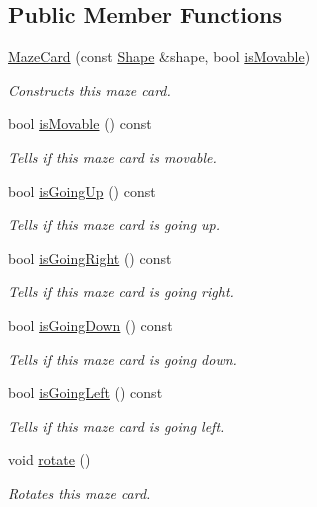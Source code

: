 \subsection*{Public Member Functions}
\begin{DoxyCompactItemize}
\item 
\mbox{\hyperlink{structlabyrinth_1_1_maze_card_aeecd62a0f2f0336fb36cb44e479f4ce2}{Maze\+Card}} (const \mbox{\hyperlink{structlabyrinth_1_1_maze_card_1_1_shape}{Shape}} \&shape, bool \mbox{\hyperlink{structlabyrinth_1_1_maze_card_ae4c534a31b1ac1616d7116d9eb1a39fd}{is\+Movable}})
\begin{DoxyCompactList}\small\item\em Constructs this maze card. \end{DoxyCompactList}\item 
bool \mbox{\hyperlink{structlabyrinth_1_1_maze_card_ae4c534a31b1ac1616d7116d9eb1a39fd}{is\+Movable}} () const
\begin{DoxyCompactList}\small\item\em Tells if this maze card is movable. \end{DoxyCompactList}\item 
bool \mbox{\hyperlink{structlabyrinth_1_1_maze_card_a61d4cb61ddac8e88c5df81b355efd718}{is\+Going\+Up}} () const
\begin{DoxyCompactList}\small\item\em Tells if this maze card is going up. \end{DoxyCompactList}\item 
bool \mbox{\hyperlink{structlabyrinth_1_1_maze_card_a97b349c57d3bad5d88ef541a481fe93b}{is\+Going\+Right}} () const
\begin{DoxyCompactList}\small\item\em Tells if this maze card is going right. \end{DoxyCompactList}\item 
bool \mbox{\hyperlink{structlabyrinth_1_1_maze_card_a4b8d8f61a63fc14b766c290fe6a4efcd}{is\+Going\+Down}} () const
\begin{DoxyCompactList}\small\item\em Tells if this maze card is going down. \end{DoxyCompactList}\item 
bool \mbox{\hyperlink{structlabyrinth_1_1_maze_card_ae5637468f45289f1349e347f8773f5d3}{is\+Going\+Left}} () const
\begin{DoxyCompactList}\small\item\em Tells if this maze card is going left. \end{DoxyCompactList}\item 
\mbox{\label{structlabyrinth_1_1_maze_card_a8c9852227c575c5d27494313d6d1834b}} 
void \mbox{\hyperlink{structlabyrinth_1_1_maze_card_a8c9852227c575c5d27494313d6d1834b}{rotate}} ()
\begin{DoxyCompactList}\small\item\em Rotates this maze card. \end{DoxyCompactList}\end{DoxyCompactItemize}
